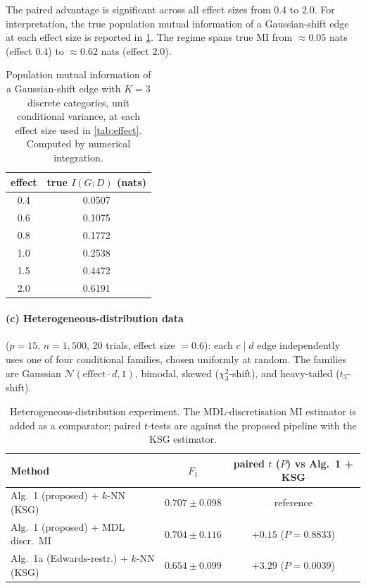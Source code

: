 The paired advantage is significant across all effect sizes from
0.4 to 2.0. For interpretation, the true population mutual
information of a Gaussian-shift edge at each effect size is reported
in \cref{tab:effect_mi}. The regime spans true MI from
$\approx 0.05$ nats (effect $0.4$) to $\approx 0.62$ nats (effect
$2.0$).

\begin{table}[ht]
\centering
\caption{Population mutual information of a Gaussian-shift edge with
$K = 3$ discrete categories, unit conditional variance, at each
effect size used in \cref{tab:effect}. Computed by numerical
integration.}
\label{tab:effect_mi}
\begin{tabular}{cc}
\toprule
effect & true $I(G; D)$ (nats) \\
\midrule
0.4 & 0.0507 \\
0.6 & 0.1075 \\
0.8 & 0.1772 \\
1.0 & 0.2538 \\
1.5 & 0.4472 \\
2.0 & 0.6191 \\
\bottomrule
\end{tabular}
\end{table}

\paragraph{(c) Heterogeneous-distribution data} ($p = 15$,
$n = 1{,}500$, 20 trials, effect size $= 0.6$): each $c \mid d$ edge
independently uses one of four conditional families, chosen uniformly
at random. The families are Gaussian
$\mathcal{N}(\text{effect}\cdot d, 1)$, bimodal, skewed
($\chi^2_3$-shift), and heavy-tailed ($t_3$-shift).

\begin{table}[ht]
\centering
\caption{Heterogeneous-distribution experiment. The
MDL-discretisation MI estimator \citep{suzuki2017chow} is added as a
comparator; paired $t$-tests are against the proposed pipeline with
the KSG estimator.}
\label{tab:hetero}
\begin{tabular}{lcc}
\toprule
Method & $F_1$ & paired $t$ ($P$) vs Alg.~1 + KSG \\
\midrule
Alg.~1 (proposed) + $k$-NN (KSG)        & $0.707 \pm 0.098$ & reference \\
Alg.~1 (proposed) + MDL discr.\ MI      & $0.704 \pm 0.116$ & $+0.15$ ($P = 0.8833$) \\
Alg.~1a (Edwards-restr.) + $k$-NN (KSG) & $0.654 \pm 0.099$ & $+3.29$ ($P = 0.0039$) \\
\bottomrule
\end{tabular}
\end{table}

